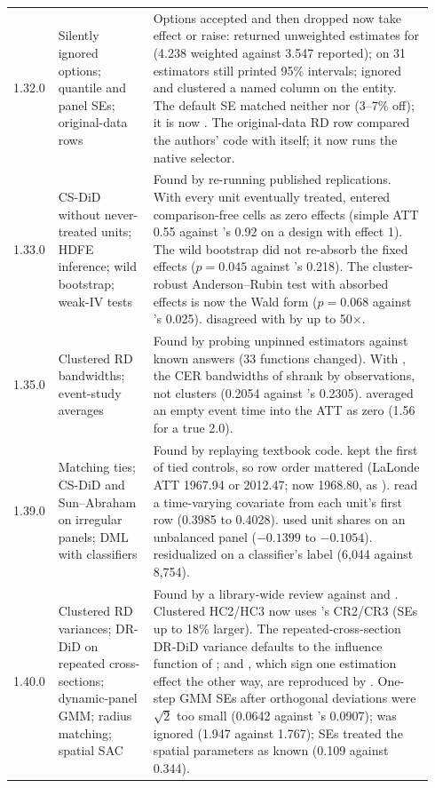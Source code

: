 \begin{longtable}{@{}L{0.07\linewidth}L{0.22\linewidth}p{0.65\linewidth}@{}}
1.32.0 & Silently ignored options; quantile and panel SEs; original-data rows & Options accepted and then dropped now take effect or raise:  returned unweighted estimates for  (4.238 weighted against 3.547 reported);  on 31 estimators still printed 95\% intervals;  ignored  and clustered a named  column on the entity. The  default SE matched neither  nor  (3--7\% off); it is now . The original-data RD row compared the authors' code with itself; it now runs the native selector. \\
1.33.0 & CS-DiD without never-treated units; HDFE inference; wild bootstrap; weak-IV tests & Found by re-running published replications. With every unit eventually treated,  entered comparison-free cells as zero effects (simple ATT 0.55 against 's 0.92 on a design with effect 1). The  wild bootstrap did not re-absorb the fixed effects (\(p=0.045\) against 's 0.218). The cluster-robust Anderson--Rubin test with absorbed effects is now the Wald form (\(p=0.068\) against 's 0.025).  disagreed with  by up to 50\(\times\). \\
1.35.0 & Clustered RD bandwidths; event-study averages & Found by probing unpinned estimators against known answers (33 functions changed). With , the CER bandwidths of  shrank by observations, not clusters (0.2054 against 's 0.2305).  averaged an empty event time into the ATT as zero (1.56 for a true 2.0). \\
1.39.0 & Matching ties; CS-DiD and Sun--Abraham on irregular panels; DML with classifiers & Found by replaying textbook code.  kept the first of tied controls, so row order mattered (LaLonde ATT 1967.94 or 2012.47; now 1968.80, as ).  read a time-varying covariate from each unit's first row (0.3985 to 0.4028).  used unit shares on an unbalanced panel (\(-0.1399\) to \(-0.1054\)).  residualized on a classifier's label (6{,}044 against 8{,}754). \\
1.40.0 & Clustered RD variances; DR-DiD on repeated cross-sections; dynamic-panel GMM; radius matching; spatial SAC & Found by a library-wide review against  and . Clustered HC2/HC3  now uses 's CR2/CR3 (SEs up to 18\% larger). The repeated-cross-section DR-DiD variance defaults to the influence function of \citet{santanna2020doubly};  and , which sign one estimation effect the other way, are reproduced by . One-step GMM SEs after orthogonal deviations were \(\sqrt{2}\) too small (0.0642 against 's 0.0907);  was ignored (1.947 against 1.767);  SEs treated the spatial parameters as known (0.109 against 0.344). \\

\end{longtable}
